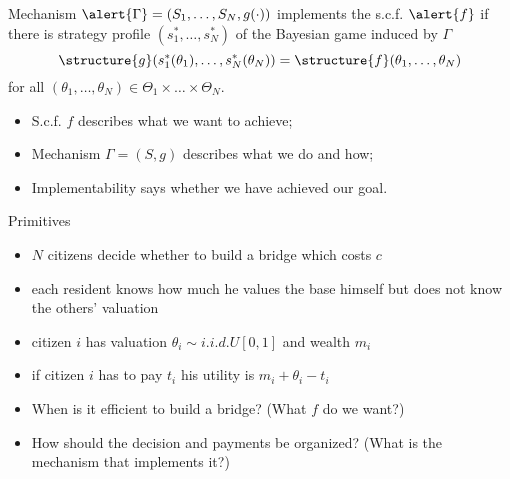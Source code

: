 \documentclass[english]{beamer}		%
\def\lyxframeend{} %
\begin{document}
\begin{definition}[implementation]
	Mechanism $\alert{\Gamma}=(S_{1},\dots,S_{N},g(\cdot))$ \alert{implements} the s.c.f. $\alert{f}$ if there is  strategy profile $(s_{1}^{*},\dots,s_{N}^{*})$ of the Bayesian game induced by $\Gamma$  
	$$\structure{g}(s_{1}^{*}(\theta_{1}),\dots,s_{N}^{*}(\theta_{N})) = \structure{f} (\theta_{1},\dots,\theta_{N})$$ 
	for all $(\theta_{1},\dots,\theta_{N})\in\Theta_{1}\times\dots \times\Theta_{N}$.
\end{definition}
\lyxframeend


\begin{itemize}
	\item S.c.f. $f$ describes what we want to achieve;
	\item Mechanism $\Gamma = (S,g)$ describes what we do and how;
	\item Implementability says whether we have achieved our goal.
\end{itemize}
\lyxframeend


\begin{exampleblock}{Primitives}
	\begin{itemize}
		\item $N$ citizens decide whether to build a bridge which costs $c$
		\item each resident knows how much he values the base himself but does not know the others' valuation
		\item citizen $i$ has valuation $\theta_{i} \sim i.i.d.U[0,1]$ and wealth $m_{i}$
		\item if citizen $i$ has to pay $t_{i}$ his utility is $m_{i}+\theta_{i}-t_{i}$
	\end{itemize}
\end{exampleblock}
\begin{itemize}
	\item When is it efficient to build a bridge? (What $f$ do we want?)
	\item How should the decision and payments be organized? (What is the mechanism that implements it?)
\end{itemize}
\lyxframeend
\end{document}
